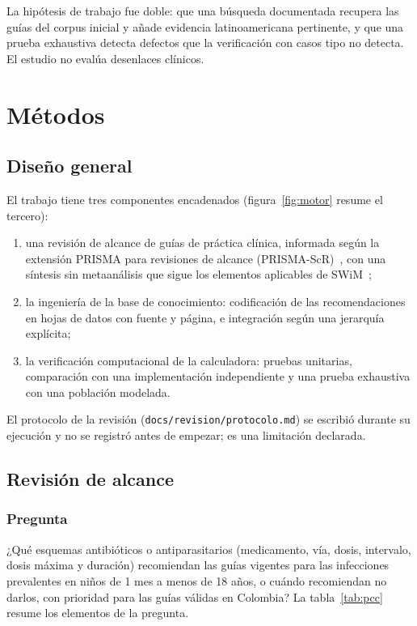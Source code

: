 \documentclass[11pt,a4paper]{article}
\newcommand{\codigo}[1]{\texttt{\small #1}}
\begin{document}
La hipótesis de trabajo fue doble: que una búsqueda documentada recupera las guías del corpus inicial y añade evidencia latinoamericana pertinente, y que una prueba exhaustiva detecta defectos que la verificación con casos tipo no detecta. El estudio no evalúa desenlaces clínicos.

\section{Métodos}

\subsection{Diseño general}

El trabajo tiene tres componentes encadenados (figura~\ref{fig:motor} resume el tercero):

\begin{enumerate}[label=(\alph*)]
  \item una revisión de alcance de guías de práctica clínica, informada según la extensión PRISMA para revisiones de alcance (PRISMA-ScR)~\citep{tricco2018}, con una síntesis sin metaanálisis que sigue los elementos aplicables de SWiM~\citep{campbell2020};
  \item la ingeniería de la base de conocimiento: codificación de las recomendaciones en hojas de datos con fuente y página, e integración según una jerarquía explícita;
  \item la verificación computacional de la calculadora: pruebas unitarias, comparación con una implementación independiente y una prueba exhaustiva con una población modelada.
\end{enumerate}

El protocolo de la revisión (\codigo{docs/revision/protocolo.md}) se escribió durante su ejecución y no se registró antes de empezar; es una limitación declarada.

\subsection{Revisión de alcance}

\subsubsection{Pregunta}

¿Qué esquemas antibióticos o antiparasitarios (medicamento, vía, dosis, intervalo, dosis máxima y duración) recomiendan las guías vigentes para las infecciones prevalentes en niños de 1 mes a menos de 18 años, o cuándo recomiendan no darlos, con prioridad para las guías válidas en Colombia? La tabla~\ref{tab:pcc} resume los elementos de la pregunta.
\end{document}
